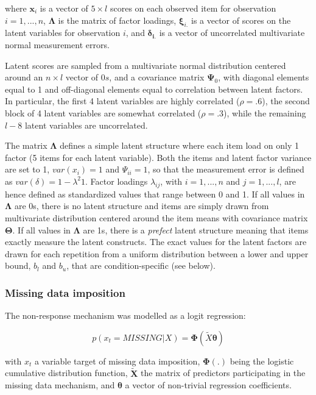 	where $\bm{x}_i$ is a vector of $5 \times l$ scores on each observed item for observation $i = 1, ..., n$,
	$\bm{\Lambda}$ is the matrix of factor loadings, $\bm{\xi}_{i.}$ is a vector of scores on the
	latent variables for observation $i$, and $\bm{\delta_{i.}}$ is a vector of uncorrelated multivariate 
	normal measurement errors.

	Latent scores are sampled from a multivariate normal distribution centered around an $n \times l$ 
	vector of $0s$, and a covariance matrix $\bm{\Psi}_0$, with diagonal elements equal to 1 and off-diagonal 
	elements equal to correlation between latent factors. In particular, the first 4 latent variables
	are highly correlated ($\rho = .6$), the second block of 4 latent variables are somewhat correlated 
	($\rho = .3$), while the remaining $l-8$ latent variables are uncorrelated.

	The matrix $\bm{\Lambda}$ defines a simple latent structure where each item load on only 1 factor (5 items 
	for each latent variable).
	Both the items and latent factor variance are set to 1, $var(x_i) = 1$ and $\Psi_{ii} = 1$, so that 
	the measurement error is defined as $var(\delta) = 1 - \lambda^{2} 1$. 
	Factor loadings $\lambda_{ij}$, with $i = 1, ..., n$ and $j = 1, ..., l$, are hence defined as standardized 
	values that range between 0 and 1.
	If all values in $\bm{\Lambda}$ are 0s, there is no latent structure and items are simply drawn from  
	multivariate distribution centered around the item means with covariance matrix $\bm{\Theta}$.
	If all values in $\bm{\Lambda}$ are 1s, there is a \emph{prefect} latent structure meaning that items
	exactly measure the latent constructs.
	The exact values for the latent factors are drawn for each repetition from a uniform distribution between
	a lower and upper bound, $b_l$ and $b_u$, that are condition-specific (see below).

\subsubsection{Missing data imposition} \label{subsub_missing}

	The non-response mechanism was modelled as a logit regression:

	\begin{equation} \label{eqn:rm}
		p(x_t = MISSING | X) = \bm{\Phi}(\tilde{X}\bm{\theta})
	\end{equation}

	with $x_t$ a variable target of missing data imposition, $\bm{\Phi}(.)$ being the logistic cumulative
	distribution function, $\bm{\tilde{X}}$ the matrix of predictors participating in the missing data mechanism,
	and $\bm{\theta}$ a vector of non-trivial regression coefficients.
	
